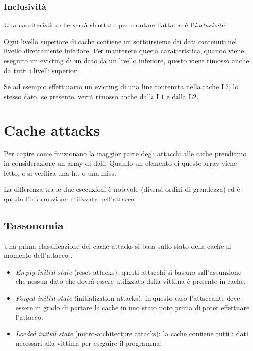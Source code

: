 			\subsubsection{Inclusività}
				Una caratteristica che verrà sfruttata per montare l'attacco è l'\emph{inclusività}. 
				
				Ogni livello superiore di cache contiene un sottoinsieme dei dati contenuti nel livello direttamente inferiore. Per mantenere questa caratteristica, quando viene eseguito un evicting di un dato da un livello inferiore, questo viene rimosso anche da tutti i livelli superiori.
				
				Se ad esempio effettuiamo un evicting di una line contenuta nella cache L$3$, lo stesso dato, se presente, verrà rimosso anche dalla L$1$ e dalla L$2$.
				
	\section{Cache attacks}
		Per capire come funzionano la maggior parte degli attacchi alle cache prendiamo in considerazione un array di dati. Quando un elemento di questo array viene letto, o si verifica una hit o una miss.
		
		La differenza tra le due esecuzioni è notevole (diversi ordini di grandezza) ed è questa l'informazione utilizzata nell'attacco.
		
		\subsection{Tassonomia}
			Una prima classificazione dei cache attacks si basa sullo stato della cache al momento dell'attacco \cite{canteaut2006understanding}.
			
			\begin{itemize}
				\item \emph{Empty initial state} (reset attacks): questi attacchi si basano sull'assunzione che nessun dato che dovrà essere utilizzato dalla vittima è presente in cache.
				\item \emph{Forged initial state} (initialization attacks): in questo caso l'attaccante deve essere in grado di portare la cache in uno stato noto prima di poter effettuare l'attacco.
				\item \emph{Loaded initial state} (micro-architecture attacks): la cache contiene tutti i dati necessari alla vittima per eseguire il programma.
			\end{itemize}
		
